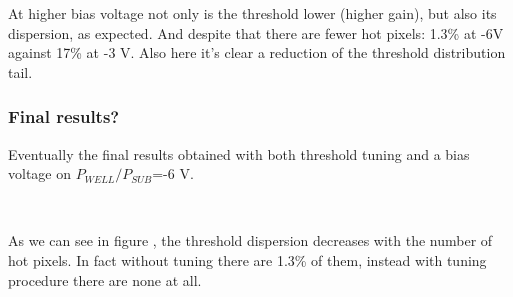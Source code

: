 At higher bias voltage not only is the threshold lower (higher gain), but also its dispersion, as expected. And despite that there are fewer hot pixels: 1.3\% at -6V against 17\% at -3 V. Also here it's clear a reduction of the threshold distribution tail. 

\subsubsection{Final results?}

Eventually the final results obtained with both threshold tuning and a bias voltage on $P_{WELL}/P_{SUB}$=-6 V. 

\begin{figure}[h!]
\centering
{}\quad
{}\\
\label{fig:bias_tuning}
\end{figure}

As we can see in figure , the threshold dispersion decreases with the number of hot pixels. In fact without tuning there are 1.3\% of them, instead with tuning procedure there are none at all.






\begin{comment}
Suggestions from OBELIX meeting.

Probably the coupling is linked to digital power. 
Not from the bulk: +4 clk seems to be the indication for not a direct coupling

Since the distribution of the power is from the edge,  first and last column should be more solid against this effect and hot pixel should be more present in the center? 
They asked if we have a  map of the hot pixels

Also suggested to change the clock and see if the delay from the FREEZE edge is at the same delay or not. 

\end{comment}



